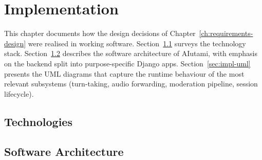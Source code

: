 \chapter{Implementation}
\label{ch:implementation}


This chapter documents how the design decisions of
Chapter~\ref{ch:requirements-design} were realised in working software.
Section~\ref{sec:impl-technologies} surveys the technology stack.
Section~\ref{sec:impl-architecture} describes the software architecture
of AIutami, with emphasis on the backend split into purpose-specific
Django apps. Section~\ref{sec:impl-uml} presents the UML diagrams that
capture the runtime behaviour of the most relevant subsystems
(turn-taking, audio forwarding, moderation pipeline, session
lifecycle).

\section{Technologies}
\label{sec:impl-technologies}

\section{Software Architecture}
\label{sec:impl-architecture}

